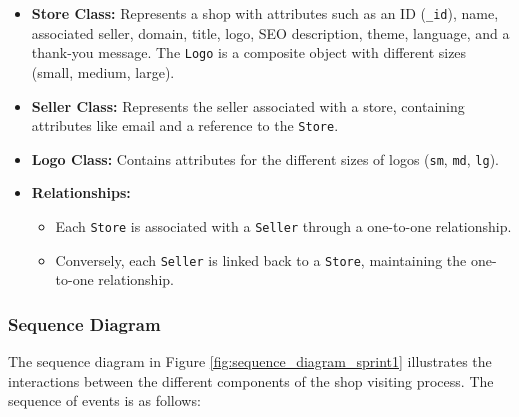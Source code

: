 \begin{itemize}
    \item \textbf{Store Class:} Represents a shop with attributes such as an ID (\texttt{\_id}), name, associated seller, domain, title, logo, SEO description, theme, language, and a thank-you message. The \texttt{Logo} is a composite object with different sizes (small, medium, large).
    
    \item \textbf{Seller Class:} Represents the seller associated with a store, containing attributes like email and a reference to the \texttt{Store}.
    
    \item \textbf{Logo Class:} Contains attributes for the different sizes of logos (\texttt{sm}, \texttt{md}, \texttt{lg}).
    
    \item \textbf{Relationships:}
    \begin{itemize}
        \item Each \texttt{Store} is associated with a \texttt{Seller} through a one-to-one relationship.
        \item Conversely, each \texttt{Seller} is linked back to a \texttt{Store}, maintaining the one-to-one relationship.
    \end{itemize}
\end{itemize}

\subsubsection{Sequence Diagram}

The sequence diagram in Figure \ref{fig:sequence_diagram_sprint1} illustrates the interactions between the different components of the shop visiting process. The sequence of events is as follows:


